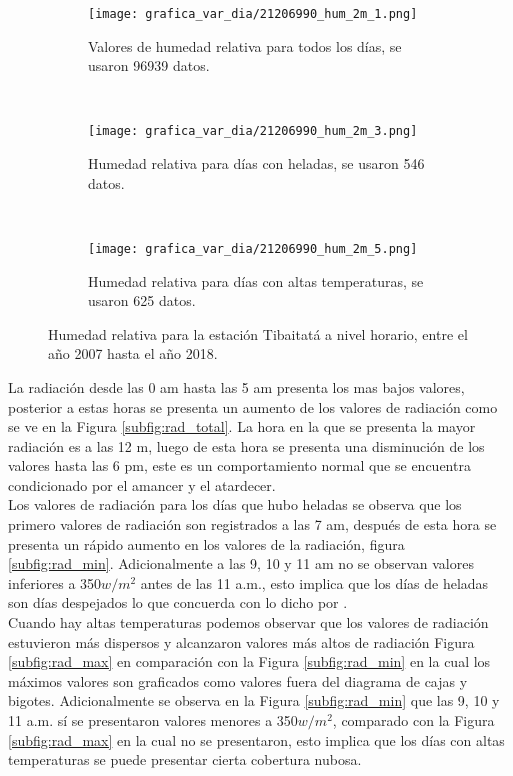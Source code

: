 \begin{figure}[H]
    \centering
    \begin{subfigure}[b]{0.45\textwidth}
       \caption{Valores de humedad relativa para todos los días, se usaron 96939 datos.}
	\texttt{[image: grafica\_var\_dia/21206990\_hum\_2m\_1.png]}
     \label{subfig:hum_total}
	\end{subfigure}
	~
    \begin{subfigure}[b]{0.45\textwidth}
       \caption{Humedad relativa para días con heladas, se usaron 546 datos.}
	\texttt{[image: grafica\_var\_dia/21206990\_hum\_2m\_3.png]}
     \label{subfig:hum_min}
	\end{subfigure}
		~
    \begin{subfigure}[b]{0.45\textwidth}
       \caption{Humedad relativa para días con altas temperaturas, se usaron 625 datos.}
	\texttt{[image: grafica\_var\_dia/21206990\_hum\_2m\_5.png]}
     \label{subfig:hum_max}
	\end{subfigure}
	
    \caption{Humedad relativa para la estación Tibaitatá a nivel horario, entre el año 2007 hasta el año 2018.}
    \label{fig:hr_tibaitata}
\end{figure}


La radiación desde las 0 am hasta las 5 am presenta los mas bajos valores, posterior a estas horas se presenta un aumento de los valores de radiación como se ve en la Figura \ref{subfig:rad_total}. La hora en la que se presenta la mayor radiación es a las 12 m, luego de esta hora se presenta una disminución de los valores hasta las 6 pm, este es un comportamiento normal que se encuentra condicionado por el amancer y el atardecer.\\

Los valores de radiación para los días que hubo heladas se observa que los primero valores de radiación son registrados a las 7 am, después de esta hora se presenta un rápido aumento en los valores de la radiación, figura \ref{subfig:rad_min}. Adicionalmente a las 9, 10 y 11 am no se observan valores inferiores a 350$w/m^2$ antes de las 11 a.m., esto implica que los días de heladas son días despejados lo que concuerda con lo dicho por \citet{Snyder2005}.\\

Cuando hay altas temperaturas podemos observar que los valores de radiación estuvieron más dispersos y alcanzaron valores más altos de radiación Figura \ref{subfig:rad_max} en comparación con la Figura \ref{subfig:rad_min} en la cual los máximos valores son graficados como valores fuera del diagrama de cajas y bigotes. Adicionalmente se observa en la Figura \ref{subfig:rad_min} que las 9, 10 y 11 a.m. sí se presentaron valores menores a 350$w/m^2$, comparado con la Figura \ref{subfig:rad_max} en la cual no se presentaron, esto implica que los días con altas temperaturas se puede presentar cierta cobertura nubosa.\\

